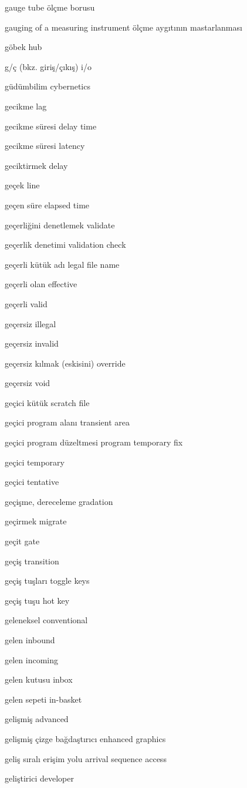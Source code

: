 \documentclass[12pt,fleqn]{article}\usepackage{../../common}
\begin{document}
gauge tube ölçme borusu

gauging of a measuring instrument ölçme aygıtının mastarlanması

göbek hub

g/ç (bkz. giriş/çıkış) i/o

güdümbilim cybernetics

gecikme lag

gecikme süresi delay time

gecikme süresi latency

geciktirmek delay

geçek line

geçen süre elapsed time

geçerliğini denetlemek validate

geçerlik denetimi validation check

geçerli kütük adı legal file name

geçerli olan effective

geçerli valid

geçersiz illegal

geçersiz invalid

geçersiz kılmak (eskisini) override

geçersiz void

geçici kütük scratch file

geçici program alanı transient area

geçici program düzeltmesi program temporary fix

geçici temporary

geçici tentative

geçişme, dereceleme gradation

geçirmek migrate

geçit gate

geçiş transition

geçiş tuşları toggle keys

geçiş tuşu hot key

geleneksel conventional

gelen inbound

gelen incoming

gelen kutusu inbox

gelen sepeti in-basket

gelişmiş advanced

gelişmiş çizge bağdaştırıcı enhanced graphics

geliş sıralı erişim yolu arrival sequence access

geliştirici developer
\end{document}
